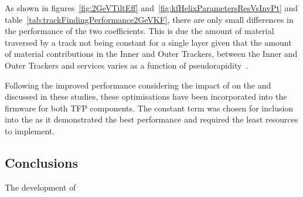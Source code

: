 As shown in figures~\ref{fig:2GeVTiltEff} and~\ref{fig:kfHelixParametersResVsInvPt} and table~\ref{tab:trackFindingPerformance2GeVKF}, there are only small differences in the performance of the two \MS coefficients.
This is due the amount of material traversed by a track not being constant for a single layer given that the amount of material contributions in the Inner and Outer Trackers, between the Inner and Outer Trackers and services varies as a function of pseudorapidity~\cite{P2TrackerTDR}.

Following the improved performance considering the impact of \MS on the \HT and \KF discussed in these studies, these optimisations have been incorporated into the firmware for both TFP components.
The constant \MS term was chosen for inclusion into the \KF as it demonstrated the best performance and required the least resources to implement.

\subsection{Conclusions}\label{subsec:Tmtt2GeV}
The development of   

